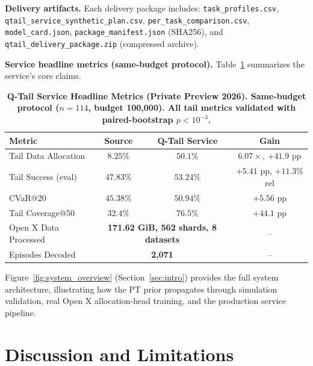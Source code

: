 \documentclass[10pt]{article}
\begin{document}
\medskip\noindent\textbf{Delivery artifacts.}
Each delivery package includes: \texttt{task\_profiles.csv},
\texttt{qtail\_service\_synthetic\_plan.csv}, \texttt{per\_task\_comparison.csv},
\texttt{model\_card.json}, \texttt{package\_manifest.json} (SHA256), and
\texttt{qtail\_delivery\_package.zip} (compressed archive).

\medskip\noindent\textbf{Service headline metrics (same-budget protocol).}
Table~\ref{tab:service_headline} summarizes the service's core claims.

\begin{table}[tp]
  \centering
  \caption{{\bf Q-Tail Service Headline Metrics (Private Preview 2026).
    Same-budget protocol ($n=114$, budget 100,000).  All tail metrics
    validated with paired-bootstrap $p<10^{-3}$.}}
  \label{tab:service_headline}
  \begin{tabular}{@{}lccc@{}}
    \toprule
    \textbf{Metric} & \textbf{Source} & \textbf{Q-Tail Service} &
    \textbf{Gain} \\
    \midrule
    Tail Data Allocation   & $8.25\%$ & $\mathbf{50.1\%}$ &
    $6.07\times$, $+41.9$ pp \\
    Tail Success (eval)    & $47.83\%$ & $\mathbf{53.24\%}$ &
    $+5.41$ pp, $+11.3\%$ rel \\
    CVaR@20                & $45.38\%$ & $\mathbf{50.94\%}$ &
    $+5.56$ pp \\
    Tail Coverage@50      & $32.4\%$ & $\mathbf{76.5\%}$ &
    $+44.1$ pp \\
    Open X Data Processed  & \multicolumn{2}{c}{\textbf{171.62 GiB, 562 shards, 8 datasets}} &
    -- \\
    Episodes Decoded       & \multicolumn{2}{c}{\textbf{2,071}} & -- \\
    \bottomrule
  \end{tabular}
\end{table}

Figure~\ref{fig:system_overview} (Section~\ref{sec:intro}) provides the full system
architecture, illustrating how the PT prior propagates through simulation validation,
real Open X allocation-head training, and the production service pipeline.

\section{Discussion and Limitations}
\label{sec:discussion}
\end{document}
